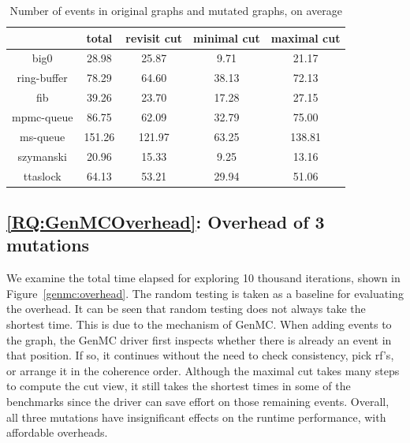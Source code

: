 \begin{table}[h!]
	\centering
	\begin{tabular}{|c|cccc|}
		\hline
		\diagbox{Benchmark}{ Strategy} & total  & revisit cut & minimal cut & maximal cut \\ \hline
		big0                           & 28.98  & 25.87       & 9.71        & 21.17       \\ \hline
		ring-buffer                    & 78.29  & 64.60       & 38.13       & 72.13       \\ \hline
		fib                            & 39.26  & 23.70       & 17.28       & 27.15       \\ \hline
		mpmc-queue                     & 86.75  & 62.09       & 32.79       & 75.00       \\ \hline
		ms-queue                       & 151.26 & 121.97      & 63.25       & 138.81      \\ \hline
		szymanski                      & 20.96  & 15.33       & 9.25        & 13.16       \\ \hline
		ttaslock                       & 64.13  & 53.21       & 29.94       & 51.06       \\ \hline
	\end{tabular}
	\label{genmc:average-events}
	\caption{Number of events in original graphs and mutated graphs, on average}
\end{table}





\subsection{\ref*{RQ:GenMCOverhead}: Overhead of 3 mutations }

We examine the total time elapsed for exploring 10 thousand iterations, shown in Figure~\ref{genmc:overhead}. The random testing is taken as a baseline for evaluating the overhead. It can be seen that random testing does not always take the shortest time. This is due to the mechanism of GenMC. When adding events to the graph, the GenMC driver first inspects whether there is already an event in that position. If so, it continues without the need to check consistency, pick rf's, or arrange it in the coherence order. Although the maximal cut takes many steps to compute the cut view, it still takes the shortest times in some of the benchmarks since the driver can save effort on those remaining events. Overall, all three mutations have insignificant effects on the runtime performance, with affordable overheads.




